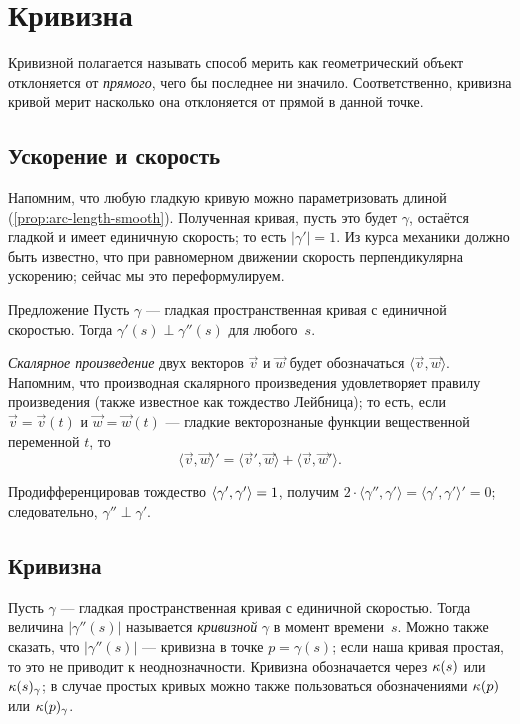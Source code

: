 \chapter{Кривизна}
\label{chap:curve-curvature}

Кривизной полагается называть способ мерить как геометрический объект отклоняется от \textit{прямого}, чего бы последнее ни значило.
Соответственно, кривизна кривой мерит насколько она отклоняется от прямой в данной точке.

\section{Ускорение и скорость}

Напомним, что любую гладкую кривую можно параметризовать длиной (\ref{prop:arc-length-smooth}).
Полученная кривая, пусть это будет $\gamma$, остаётся гладкой и имеет единичную скорость;
то есть $|\gamma'|=1$.
Из курса механики должно быть известно, что при равномерном движении скорость перпендикулярна ускорению;
сейчас мы это переформулируем.

\begin{thm}{Предложение}\label{prop:a'-pertp-a''}
Пусть $\gamma$ --- гладкая пространственная кривая с единичной скоростью.
Тогда $\gamma'(s)\perp \gamma''(s)$ для любого~$s$.
\end{thm}

\emph{Скалярное произведение} двух векторов $\vec v$ и $\vec w$ будет обозначаться $\langle \vec v,\vec w\rangle$.
Напомним, что производная скалярного произведения удовлетворяет правилу произведения (также известное как тождество Лейбница);
то есть, если $\vec v=\vec v(t)$ и $\vec w=\vec w(t)$ --- гладкие векторознаные функции вещественной переменной $t$, то
\[\langle \vec v,\vec w\rangle'=\langle \vec v',\vec w\rangle+\langle \vec v,\vec w'\rangle.\]

Продифференцировав тождество $\langle\gamma',\gamma'\rangle\z=1$, получим
$2\cdot \langle\gamma'',\gamma' \rangle=\langle\gamma',\gamma'\rangle'=0$;
следовательно, $\gamma''\perp\gamma'$.
\qeds

\section{Кривизна}\label{sec:curvature}

Пусть $\gamma$ --- гладкая пространственная кривая с единичной скоростью.
Тогда величина $|\gamma''(s)|$ называется \emph{кривизной} $\gamma$ в момент времени~$s$.
Можно также сказать, что $|\gamma''(s)|$ --- кривизна в точке $p=\gamma(s)$;
если наша кривая простая, то это не приводит к неоднозначности.
Кривизна обозначается через $\kappa(s)$ или $\kappa(s)_\gamma$;
в случае простых кривых можно также пользоваться обозначениями $\kappa(p)$ или $\kappa(p)_\gamma$.

